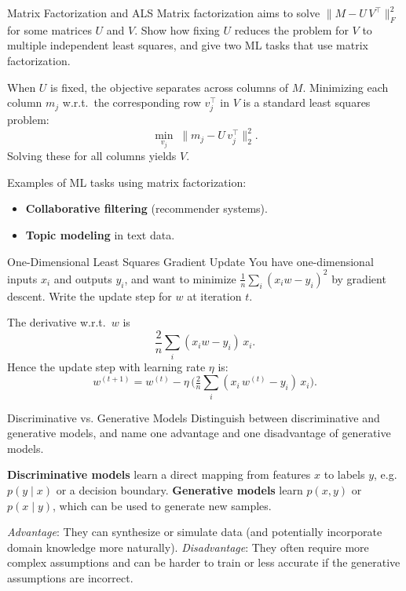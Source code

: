 \documentclass{article}
\begin{document}
\begin{exercise}{Matrix Factorization and ALS}
  Matrix factorization aims to solve $\|M - U\,V^\top\|_F^2$ for some matrices $U$ and $V$. Show how fixing $U$ reduces the problem for $V$ to multiple independent least squares, and give two ML tasks that use matrix factorization.

  \begin{solution}
    When $U$ is fixed, the objective separates across columns of $M$. Minimizing each column $m_j$ w.r.t.\ the corresponding row $v_j^\top$ in $V$ is a standard least squares problem:  
    \[
      \min_{v_j} \;\|m_j - U\,v_j^\top\|_2^2.
    \]
    Solving these for all columns yields $V$.  

    Examples of ML tasks using matrix factorization:
    \begin{itemize}
      \item \textbf{Collaborative filtering} (recommender systems).
      \item \textbf{Topic modeling} in text data.
    \end{itemize}
  \end{solution}
\end{exercise}

\begin{exercise}{One-Dimensional Least Squares Gradient Update}
  You have one-dimensional inputs $x_i$ and outputs $y_i$, and want to minimize $\frac{1}{n}\sum_i (x_i w - y_i)^2$ by gradient descent. Write the update step for $w$ at iteration $t$.

  \begin{solution}
    The derivative w.r.t.\ $w$ is  
    \[
      \frac{2}{n}\sum_i (x_i w - y_i)\,x_i.
    \]
    Hence the update step with learning rate $\eta$ is:
    \[
      w^{(t+1)} 
      = w^{(t)} 
        - \eta \,\biggl(\tfrac{2}{n}\sum_i (x_i\,w^{(t)} - y_i)\,x_i\biggr).
    \]
  \end{solution}
\end{exercise}

\begin{exercise}{Discriminative vs. Generative Models}
  Distinguish between discriminative and generative models, and name one advantage and one disadvantage of generative models.

  \begin{solution}
    \textbf{Discriminative models} learn a direct mapping from features $x$ to labels $y$, e.g.\ $p(y\!\mid\!x)$ or a decision boundary.  
    \textbf{Generative models} learn $p(x,y)$ or $p(x\!\mid\!y)$, which can be used to generate new samples.  

    \emph{Advantage}: They can synthesize or simulate data (and potentially incorporate domain knowledge more naturally).  
    \emph{Disadvantage}: They often require more complex assumptions and can be harder to train or less accurate if the generative assumptions are incorrect.
  \end{solution}
\end{exercise}
\end{document}
